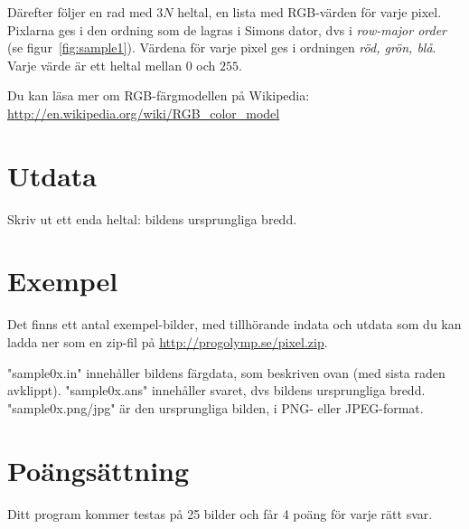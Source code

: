 Därefter följer en rad med $3N$ heltal, en lista med RGB-värden för varje pixel.
Pixlarna ges i den ordning som de lagras i Simons dator, dvs i \emph{row-major
order} (se figur~\ref{fig:sample1}). Värdena för varje pixel ges i ordningen \emph{röd,
grön, blå}. Varje värde är ett heltal mellan $0$ och $255$.

Du kan läsa mer om RGB-färgmodellen på Wikipedia: \url{http://en.wikipedia.org/wiki/RGB_color_model}

\section*{Utdata}
Skriv ut ett enda heltal: bildens ursprungliga bredd.

\section*{Exempel}
Det finns ett antal exempel-bilder, med tillhörande indata och utdata som du
kan ladda ner som en zip-fil på \url{http://progolymp.se/pixel.zip}.

"sample0x.in" innehåller bildens färgdata, som beskriven ovan (med sista raden avklippt).
"sample0x.ans" innehåller svaret, dvs bildens ursprungliga bredd.
"sample0x.png/jpg" är den ursprungliga bilden, i PNG- eller JPEG-format.

\section*{Poängsättning}
Ditt program kommer testas på 25 bilder och får 4 poäng för varje rätt svar.
